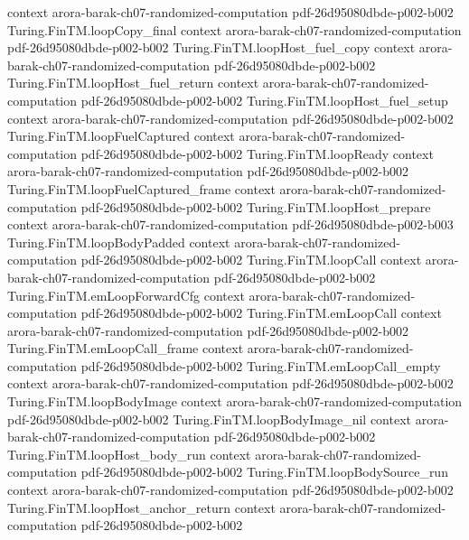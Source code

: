 \begin{theorem}
  {context}
  {arora-barak-ch07-randomized-computation}
  {pdf-26d95080dbde-p002-b002}
\proofstep
  {Turing.FinTM.loopCopy_final}
  {context}
  {arora-barak-ch07-randomized-computation}
  {pdf-26d95080dbde-p002-b002}
\proofstep
  {Turing.FinTM.loopHost_fuel_copy}
  {context}
  {arora-barak-ch07-randomized-computation}
  {pdf-26d95080dbde-p002-b002}
\proofstep
  {Turing.FinTM.loopHost_fuel_return}
  {context}
  {arora-barak-ch07-randomized-computation}
  {pdf-26d95080dbde-p002-b002}
\proofstep
  {Turing.FinTM.loopHost_fuel_setup}
  {context}
  {arora-barak-ch07-randomized-computation}
  {pdf-26d95080dbde-p002-b002}
\proofstep
  {Turing.FinTM.loopFuelCaptured}
  {context}
  {arora-barak-ch07-randomized-computation}
  {pdf-26d95080dbde-p002-b002}
\proofstep
  {Turing.FinTM.loopReady}
  {context}
  {arora-barak-ch07-randomized-computation}
  {pdf-26d95080dbde-p002-b002}
\proofstep
  {Turing.FinTM.loopFuelCaptured_frame}
  {context}
  {arora-barak-ch07-randomized-computation}
  {pdf-26d95080dbde-p002-b002}
\proofstep
  {Turing.FinTM.loopHost_prepare}
  {context}
  {arora-barak-ch07-randomized-computation}
  {pdf-26d95080dbde-p002-b003}
\proofstep
  {Turing.FinTM.loopBodyPadded}
  {context}
  {arora-barak-ch07-randomized-computation}
  {pdf-26d95080dbde-p002-b002}
\proofstep
  {Turing.FinTM.loopCall}
  {context}
  {arora-barak-ch07-randomized-computation}
  {pdf-26d95080dbde-p002-b002}
\proofstep
  {Turing.FinTM.emLoopForwardCfg}
  {context}
  {arora-barak-ch07-randomized-computation}
  {pdf-26d95080dbde-p002-b002}
\proofstep
  {Turing.FinTM.emLoopCall}
  {context}
  {arora-barak-ch07-randomized-computation}
  {pdf-26d95080dbde-p002-b002}
\proofstep
  {Turing.FinTM.emLoopCall_frame}
  {context}
  {arora-barak-ch07-randomized-computation}
  {pdf-26d95080dbde-p002-b002}
\proofstep
  {Turing.FinTM.emLoopCall_empty}
  {context}
  {arora-barak-ch07-randomized-computation}
  {pdf-26d95080dbde-p002-b002}
\proofstep
  {Turing.FinTM.loopBodyImage}
  {context}
  {arora-barak-ch07-randomized-computation}
  {pdf-26d95080dbde-p002-b002}
\proofstep
  {Turing.FinTM.loopBodyImage_nil}
  {context}
  {arora-barak-ch07-randomized-computation}
  {pdf-26d95080dbde-p002-b002}
\proofstep
  {Turing.FinTM.loopHost_body_run}
  {context}
  {arora-barak-ch07-randomized-computation}
  {pdf-26d95080dbde-p002-b002}
\proofstep
  {Turing.FinTM.loopBodySource_run}
  {context}
  {arora-barak-ch07-randomized-computation}
  {pdf-26d95080dbde-p002-b002}
\proofstep
  {Turing.FinTM.loopHost_anchor_return}
  {context}
  {arora-barak-ch07-randomized-computation}
  {pdf-26d95080dbde-p002-b002}
\proofstep

\end{theorem}
